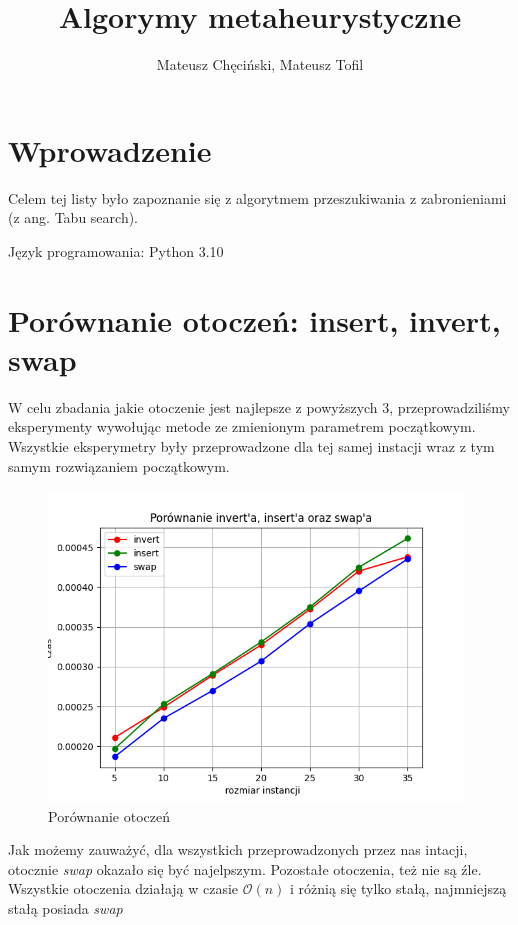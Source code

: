 \documentclass{article}
\begin{document}
    \begin{titlepage}
        \title{Algorymy metaheurystyczne}
        \author{Mateusz Chęciński, Mateusz Tofil}
        \maketitle
    \end{titlepage}

    \section{Wprowadzenie}

    Celem tej listy było zapoznanie się z algorytmem przeszukiwania z
    zabronieniami (z ang. Tabu search). 

    \noindent Język programowania: Python 3.10

    \section{Porównanie otoczeń: insert, invert, swap}

    W celu zbadania jakie otoczenie jest najlepsze z
    powyższych 3, przeprowadziliśmy eksperymenty wywołując
    metode ze zmienionym parametrem początkowym. Wszystkie
    eksperymetry były przeprowadzone dla tej samej instacji
    wraz z tym samym rozwiązaniem początkowym.

    \begin{figure}[h!]
        \centering
        \includegraphics[width=11cm]{./spr2img/Figure_1.png}
        \caption{Porównanie otoczeń}
    \end{figure}

    Jak możemy zauważyć, dla wszystkich przeprowadzonych
    przez nas intacji, otocznie \emph{swap} okazało się być
    najelpszym. Pozostałe otoczenia, też nie są źle. Wszystkie
    otoczenia działają w czasie $\mathcal{O}(n)$ i różnią się tylko
    stałą, najmniejszą stałą posiada \emph{swap}
\end{document}
